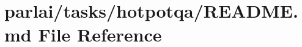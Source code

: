 \hypertarget{parlai_2tasks_2hotpotqa_2README_8md}{}\section{parlai/tasks/hotpotqa/\+R\+E\+A\+D\+ME.md File Reference}
\label{parlai_2tasks_2hotpotqa_2README_8md}

